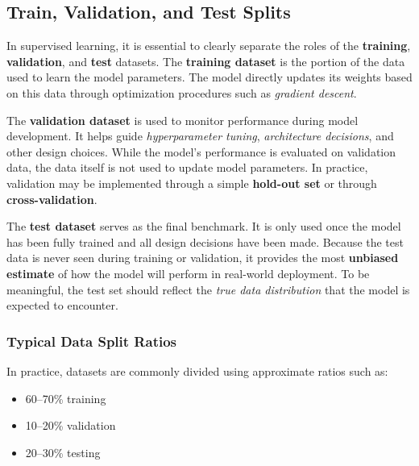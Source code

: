 \documentclass{article}
\begin{document}
\subsection{Train, Validation, and Test Splits}

In supervised learning, it is essential to clearly separate the roles of the \textbf{training}, \textbf{validation}, and \textbf{test} datasets. The \textbf{training dataset} is the portion of the data used to learn the model parameters. The model directly updates its weights based on this data through optimization procedures such as \textit{gradient descent}.

The \textbf{validation dataset} is used to monitor performance during model development. It helps guide \textit{hyperparameter tuning}, \textit{architecture decisions}, and other design choices. While the model’s performance is evaluated on validation data, the data itself is not used to update model parameters. In practice, validation may be implemented through a simple \textbf{hold-out set} or through \textbf{cross-validation}.

The \textbf{test dataset} serves as the final benchmark. It is only used once the model has been fully trained and all design decisions have been made. Because the test data is never seen during training or validation, it provides the most \textbf{unbiased estimate} of how the model will perform in real-world deployment. To be meaningful, the test set should reflect the \textit{true data distribution} that the model is expected to encounter.


\subsubsection{Typical Data Split Ratios}

In practice, datasets are commonly divided using approximate ratios such as:

\begin{itemize}
    \item 60–70\% training
    \item 10–20\% validation
    \item 20–30\% testing
\end{itemize}
\end{document}
